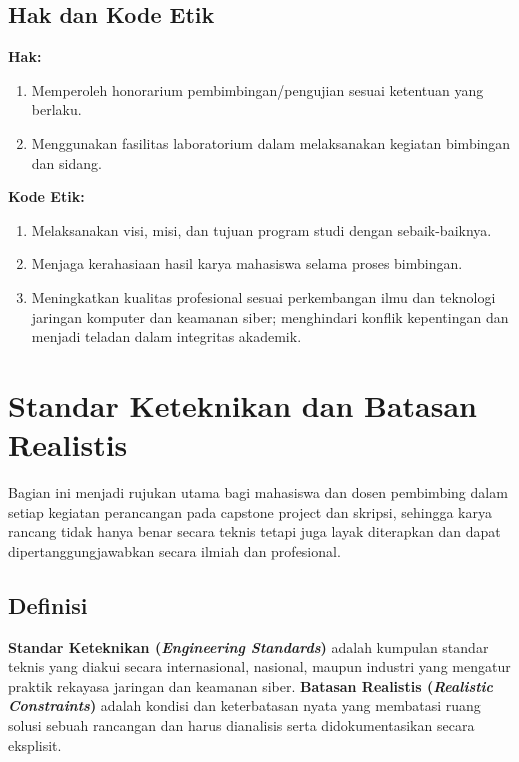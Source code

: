 \documentclass[12pt,a4paper]{report}
\begin{document}
\section{Hak dan Kode Etik}
\textbf{Hak:}
\begin{enumerate}
\item Memperoleh honorarium pembimbingan/pengujian sesuai ketentuan yang berlaku.
\item Menggunakan fasilitas laboratorium dalam melaksanakan kegiatan bimbingan dan sidang.
\end{enumerate}
\textbf{Kode Etik:}
\begin{enumerate}
\item Melaksanakan visi, misi, dan tujuan program studi dengan sebaik-baiknya.
\item Menjaga kerahasiaan hasil karya mahasiswa selama proses bimbingan.
\item Meningkatkan kualitas profesional sesuai perkembangan ilmu dan teknologi jaringan komputer dan keamanan siber; menghindari konflik kepentingan dan menjadi teladan dalam integritas akademik.
\end{enumerate}

\chapter{Standar Keteknikan dan Batasan Realistis}
\label{chap:standar}

Bagian ini menjadi rujukan utama bagi mahasiswa dan dosen pembimbing dalam setiap kegiatan perancangan pada capstone project dan skripsi, sehingga karya rancang tidak hanya benar secara teknis tetapi juga layak diterapkan dan dapat dipertanggungjawabkan secara ilmiah dan profesional.

\section{Definisi}
\textbf{Standar Keteknikan (\emph{Engineering Standards})} adalah kumpulan standar teknis yang diakui secara internasional, nasional, maupun industri yang mengatur praktik rekayasa jaringan dan keamanan siber. \textbf{Batasan Realistis (\emph{Realistic Constraints})} adalah kondisi dan keterbatasan nyata yang membatasi ruang solusi sebuah rancangan dan harus dianalisis serta didokumentasikan secara eksplisit.
\end{document}
